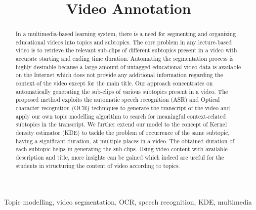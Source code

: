 \documentclass[conference]{IEEEtran}
\begin{document}
\title{Video Annotation\\}
\author{
\and
{}
}

\maketitle

\begin{abstract}
In a multimedia-based learning system, there is a need for segmenting and organizing educational videos into topics and subtopics. The core problem in any lecture-based video is to retrieve the relevant sub-clips of different subtopics present in a video with accurate starting and ending time duration. Automating the segmentation process is highly desirable because a large amount of untagged educational video data is available on the Internet which does not provide any additional information regarding the context of the video except for the main title. Our approach concentrates on automatically generating the sub-clips of various subtopics present in a video. The proposed method exploits the automatic speech recognition (ASR) and Optical character recognition (OCR) techniques to generate the transcript of the video and apply our own topic modelling algorithm to search for meaningful context-related subtopics in the transcript. We further extend our model to the concept of Kernel density estimator (KDE) to tackle the problem of occurrence of the same subtopic, having a significant duration, at multiple places in a video. The obtained duration of each subtopic helps in generating the sub-clips. Using video content with available description and title, more insights can be gained which indeed are useful for the students in structuring the content of video according to topics.
\end{abstract}

\begin{IEEEkeywords}
	Topic modelling, video segmentation, OCR, speech recognition, KDE, multimedia
\end{IEEEkeywords}
\end{document}

